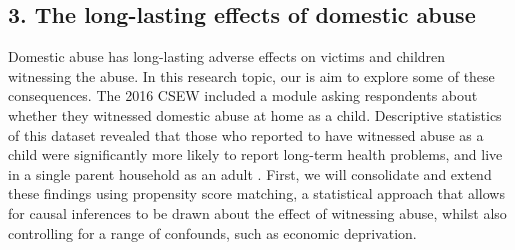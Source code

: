\documentclass[11pt, a4paper]{article}
\begin{document}

%
%
%
%


\subsection*{3. The long-lasting effects of domestic abuse}

 Domestic abuse has long-lasting adverse effects on victims and children witnessing the abuse. In this research topic, our is aim to explore some of these consequences. The 2016 CSEW included a module asking respondents about whether they witnessed domestic abuse at home as a child. Descriptive statistics of this dataset revealed that those who reported to have witnessed abuse as a child were significantly more likely to report long-term health problems, and live in a single parent household as an adult \cite{ONSChildhood}. First, we will consolidate and extend these findings using propensity score matching, a statistical approach that allows for causal inferences to be drawn about the effect of witnessing abuse, whilst also controlling for a range of confounds, such as economic deprivation. 
\end{document}
